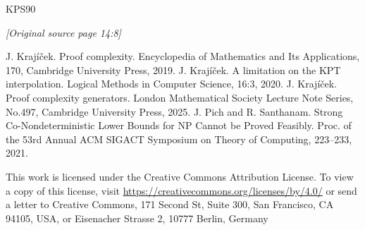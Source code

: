 \documentclass[11pt]{article}
\newcommand{\sourcepage}[1]{\par\Needspace{5\baselineskip}\bigskip\noindent\textit{[Original source page 14:#1]}\par\medskip}
\begin{document}
\begin{thebibliography}{KPS90}
\sourcepage{8}
 J. Krajíček. Proof complexity. Encyclopedia of Mathematics and Its Applications, 170, Cambridge University Press, 2019.
 J. Krajíček. A limitation on the KPT interpolation. Logical Methods in Computer Science, 16:3, 2020.
 J. Krajíček. Proof complexity generators. London Mathematical Society Lecture Note Series, No.497, Cambridge University Press, 2025.
 J. Pich and R. Santhanam. Strong Co-Nondeterministic Lower Bounds for NP Cannot be Proved Feasibly. Proc. of the 53rd Annual ACM SIGACT Symposium on Theory of Computing, 223--233, 2021.
\end{thebibliography}
This work is licensed under the Creative Commons Attribution License. To view a copy of this license, visit \url{https://creativecommons.org/licenses/by/4.0/} or send a letter to Creative Commons, 171 Second St, Suite 300, San Francisco, CA 94105, USA, or Eisenacher Strasse 2, 10777 Berlin, Germany
\end{document}
